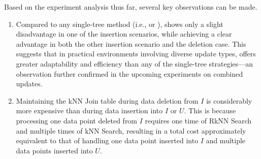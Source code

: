 Based on the experiment analysis thus far, several key observations can be made.
\begin{enumerate}
    \item Compared to any single-tree method (i.e., \hdrtree or \deltatree), \dualtree shows only a slight disadvantage in one of the insertion scenarios, while achieving a clear advantage in both the other insertion scenario and the deletion case. This suggests that in practical environments involving diverse update types, \dualtree offers greater adaptability and efficiency than any of the single-tree strategies—an observation further confirmed in the upcoming experiments on combined updates.
    \item Maintaining the kNN Join table during data deletion from $I$ is considerably more expensive than during data insertion into $I$ or $U$. This is because processing one data point deleted from $I$ requires one time of RkNN Search and multiple times of kNN Search, resulting in a total cost approximately equivalent to that of handling one data point inserted into $I$ and multiple data points inserted into $U$.
\end{enumerate}

